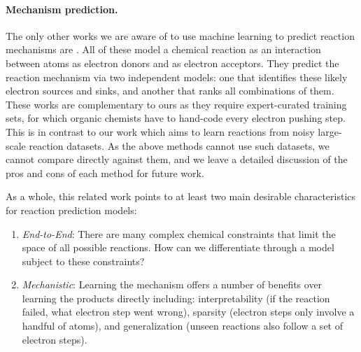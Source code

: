\paragraph{Mechanism prediction.}
The only other works we are aware of to use machine learning to predict reaction mechanisms are \cite{fooshee2018deep,kayala2012reactionpredictor,NIPS2011_4356,kayala2011learning}. All of these model a chemical reaction as an interaction between atoms as electron donors and as electron acceptors. They predict the reaction mechanism via two independent models: one that identifies these likely electron sources and sinks, and another that ranks all combinations of them.
These works are complementary to ours as they require expert-curated training sets, for which organic chemists have to hand-code every electron pushing step. %
This is in contrast to our work which aims to learn reactions from noisy large-scale reaction datasets. As the above methods cannot use such datasets, we cannot compare directly against them, and we leave a detailed discussion of the pros and cons of each method for future work.

As a whole, this related work points to at least two main desirable characteristics for reaction prediction models: 
\begin{enumerate}
\item \emph{End-to-End}: There are many complex chemical constraints that limit the space of all possible reactions. How can we differentiate through a model subject to these constraints?
\item \emph{Mechanistic}: Learning the mechanism offers a number of benefits over learning the products directly including: interpretability (if the reaction failed, what electron step went wrong), sparsity (electron steps only involve a handful of atoms), and generalization (unseen reactions also follow a set of electron steps).
\end{enumerate}

